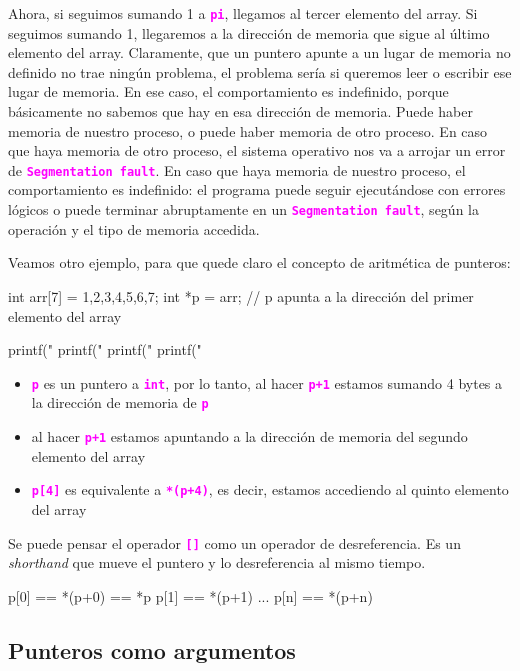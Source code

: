 \documentclass[]{scrartcl}
\newcommand{\hl}[1]{\textcolor{magenta}{\textbf{\texttt{#1}}}}
\begin{document}
Ahora, si seguimos sumando 1 a \hl{pi}, llegamos al tercer elemento del array. Si seguimos sumando 1, llegaremos a la dirección de memoria que sigue al último elemento del array. Claramente, que un puntero apunte a un lugar de memoria no definido no trae ningún problema, el problema sería si queremos leer o escribir ese lugar de memoria. En ese caso, el comportamiento es indefinido, porque básicamente no sabemos que hay en esa dirección de memoria. Puede haber memoria de nuestro proceso, o puede haber memoria de otro proceso. En caso que haya memoria de otro proceso, el sistema operativo nos va a arrojar un error de \hl{Segmentation fault}. En caso que haya memoria de nuestro proceso, el comportamiento es indefinido: el programa puede seguir ejecutándose con errores lógicos o puede terminar abruptamente en un \hl{Segmentation fault}, según la operación y el tipo de memoria accedida.

Veamos otro ejemplo, para que quede claro el concepto de aritmética de punteros:

\begin{cbox}[]{}
  int arr[7] = {1,2,3,4,5,6,7};
  int *p = arr; 
  // p apunta a la dirección del primer elemento del array

  printf("%
  printf("%
  printf("%
  printf("%
\end{cbox}

\begin{itemize}
  \item \hl{p} es un puntero a \hl{int}, por lo tanto, al hacer \hl{p+1} estamos sumando 4 bytes a la dirección de memoria de \hl{p}
  \item al hacer \hl{p+1} estamos apuntando a la dirección de memoria del segundo elemento del array
  \item \hl{p[4]} es equivalente a \hl{*(p+4)}, es decir, estamos accediendo al quinto elemento del array
\end{itemize}

Se puede pensar el operador \hl{[]} como un operador de desreferencia. Es un \textit{shorthand} que mueve el puntero y lo desreferencia al mismo tiempo.

\begin{cbox}[]{}
p[0] == *(p+0) == *p
p[1] == *(p+1)
...
p[n] == *(p+n)
\end{cbox}

\subsection*{Punteros como argumentos}
\end{document}
